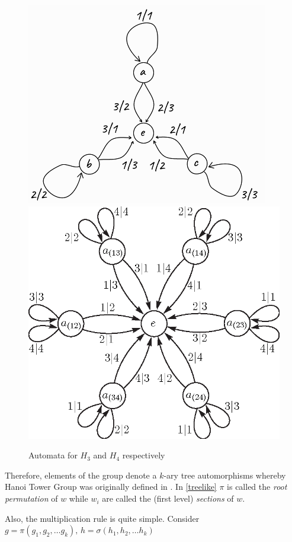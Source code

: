 \documentclass[a4paper,12pt]{amsart}
\begin{document}
\begin{figure}[h]
	\centering
	\includegraphics[scale=0.4]{H3_automaton.png}
	\includegraphics[scale=0.2]{H4_automaton.png}
	\caption{Automata for $H_3$ and $H_4$ respectively}
\end{figure}


Therefore, elements of the group denote a $k$-ary tree automorphisms whereby Hanoi Tower Group was originally defined in \cite{Hanoi1}. In \eqref{treelike} $\pi$ is called the \textit{root permutation} of $w$ while $w_i$ are called the (first level) \textit{sections} of $w$. 

Also, the multiplication rule is quite simple. Consider $g = \pi (g_1, g_2,\dots g_k), \, h = \sigma (h_1, h_2, \dots h_k)$ 
\end{document}
